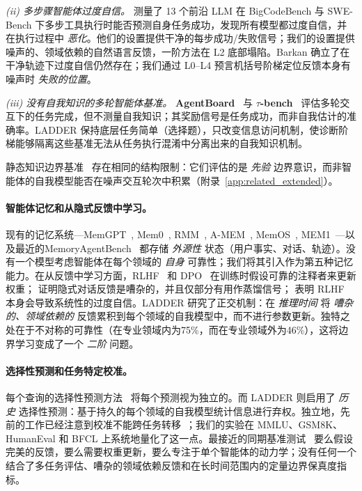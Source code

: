 \documentclass[11pt,a4paper,fontset=fandol]{ctexart}
\begin{document}
\emph{(ii) 多步骤智能体过度自信。} \citet{barkan2026capable} 测量了 13 个前沿 LLM 在 BigCodeBench 与 SWE-Bench 下多步工具执行时能否预测自身任务成功，发现所有模型都过度自信，并在执行过程中 \emph{恶化}。他们的设置提供干净的每步成功/失败信号；我们的设置提供噪声的、领域依赖的自然语言反馈，一阶方法在 L2 底部塌陷。Barkan 确立了在干净轨迹下过度自信仍然存在；我们通过 L0--L4 预言机括号阶梯定位反馈本身有噪声时 \emph{失败的位置}。

\emph{(iii) 没有自我知识的多轮智能体基准。} \textbf{AgentBoard}~\citep{ma2024agentboard} 与 \textbf{$\tau$-bench}~\citep{yao2024taubench} 评估多轮交互下的任务完成，但不测量自我知识；其奖励信号是任务成功，而非自我估计的准确率。LADDER 保持底层任务简单（选择题），只改变信息访问机制，使诊断阶梯能够隔离这些基准无法从任务执行混淆中分离出来的自我知识机制。

静态知识边界基准~\citep{li2025knowledge_boundary, yin2024benchmarking_boundary, wei2024simpleqa, hendrycks2021measuring, lin2022truthfulqa, liang2022helm, geng2024survey} 存在相同的结构限制：它们评估的是 \emph{先验} 边界意识，而非智能体的自我模型能否在噪声交互轮次中积累（附录~\ref{app:related_extended}）。

\paragraph{智能体记忆和从隐式反馈中学习。} 现有的记忆系统---MemGPT~\citep{packer2023memgpt}, Mem0~\citep{mem02025}, RMM~\citep{tan2025rmm}, A-MEM~\citep{xu2025amem}, MemOS~\citep{li2025memos}, MEM1~\citep{mem1_2026}---以及最近的MemoryAgentBench~\citep{hu2026memoryagent} 都存储 \emph{外源性} 状态（用户事实、对话、轨迹）。没有一个模型考虑智能体在每个领域的 \emph{自身} 可靠性；我们将其引入作为第五种记忆能力。在从反馈中学习方面，RLHF~\citep{ouyang2022training} 和 DPO~\citep{rafailov2024direct} 在训练时假设可靠的注释者来更新权重；\citet{liu2025implicit} 证明隐式对话反馈是嘈杂的，并且仅部分有用作蒸馏信号；\citet{leng2025taming} 表明 RLHF 本身会导致系统性的过度自信。LADDER 研究了正交机制：在 \emph{推理时间} 将 \emph{嘈杂的、领域依赖的} 反馈累积到每个领域的自我模型中，而不进行参数更新。独特之处在于不对称的可靠性（在专业领域内为75\%，而在专业领域外为46\%），这将边界学习变成了一个 \emph{二阶} 问题。

\paragraph{选择性预测和任务特定校准。} 每个查询的选择性预测方法~\citep{kapoor2024taught, diao2024rtuning, xu2024sayself, traub2024augrc, li2025abstention, kirichenko2025abstentionbench, ahdritz2024knowable} 将每个预测视为独立的。而 LADDER 则启用了 \emph{历史} 选择性预测：基于持久的每个领域的自我模型统计信息进行弃权。独立地，先前的工作已经注意到校准不能跨任务转移~\citep{shen2024thermometer, chen2024reconfidencing, manggala2025qacal}；我们的实验在 MMLU、GSM8K、HumanEval 和 BFCL 上系统地量化了这一点。最接近的同期基准测试~\citep{fang2025ccg, han2024lepe, dong2025rlplus, zhou2026sim2real, omnibehavior2025} 要么假设完美的反馈，要么需要权重更新，要么专注于单个智能体的动力学；没有任何一个结合了多任务评估、嘈杂的领域依赖反馈和在长时间范围内的定量边界保真度指标。
\end{document}
